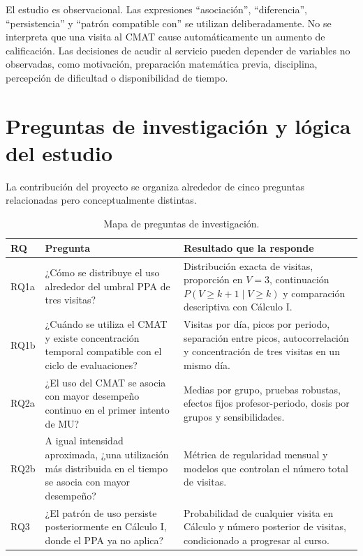 \documentclass[11pt,letterpaper]{article}
\begin{document}
\begin{cautionbox}
El estudio es observacional. Las expresiones ``asociación'', ``diferencia'', ``persistencia'' y ``patrón compatible con'' se utilizan deliberadamente. No se interpreta que una visita al CMAT cause automáticamente un aumento de calificación. Las decisiones de acudir al servicio pueden depender de variables no observadas, como motivación, preparación matemática previa, disciplina, percepción de dificultad o disponibilidad de tiempo.
\end{cautionbox}

\section{Preguntas de investigación y lógica del estudio}

La contribución del proyecto se organiza alrededor de cinco preguntas relacionadas pero conceptualmente distintas.

\begin{table}[H]
\centering
\caption{Mapa de preguntas de investigación.}
\label{tab:rqmap}
\begin{tabularx}{\textwidth}{@{}p{1.25cm}X X@{}}
\toprule
\textbf{RQ} & \textbf{Pregunta} & \textbf{Resultado que la responde} \\
\midrule
RQ1a & ¿Cómo se distribuye el uso alrededor del umbral PPA de tres visitas? & Distribución exacta de visitas, proporción en $V=3$, continuación $P(V\geq k+1\mid V\geq k)$ y comparación descriptiva con Cálculo I. \\
RQ1b & ¿Cuándo se utiliza el CMAT y existe concentración temporal compatible con el ciclo de evaluaciones? & Visitas por día, picos por periodo, separación entre picos, autocorrelación y concentración de tres visitas en un mismo día. \\
RQ2a & ¿El uso del CMAT se asocia con mayor desempeño continuo en el primer intento de MU? & Medias por grupo, pruebas robustas, efectos fijos profesor-periodo, dosis por grupos y sensibilidades. \\
RQ2b & A igual intensidad aproximada, ¿una utilización más distribuida en el tiempo se asocia con mayor desempeño? & Métrica de regularidad mensual y modelos que controlan el número total de visitas. \\
RQ3 & ¿El patrón de uso persiste posteriormente en Cálculo I, donde el PPA ya no aplica? & Probabilidad de cualquier visita en Cálculo y número posterior de visitas, condicionado a progresar al curso. \\
\bottomrule
\end{tabularx}
\end{table}
\end{document}
